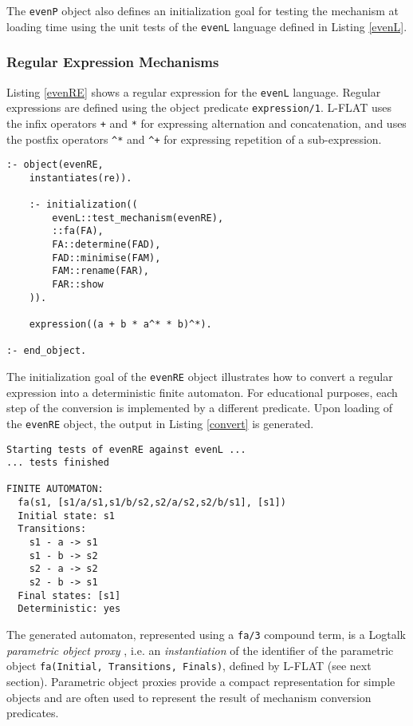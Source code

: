 \documentclass{llncs}
\begin{document}
\noindent
The \lstinline{evenP} object also defines an initialization goal for testing the mechanism at loading time using the unit tests of the \lstinline{evenL} language defined in Listing \ref{evenL}.


\subsubsection{Regular Expression Mechanisms}

Listing \ref{evenRE} shows a regular expression for the \lstinline{evenL} language. Regular expressions are defined using the object predicate \lstinline{expression/1}. L-FLAT uses the infix operators \lstinline{+} and \lstinline{*} for expressing alternation and concatenation, and uses the postfix operators \lstinline{^*} and \lstinline{^+} for expressing repetition of a sub-expression.

\begin{lstlisting}[caption={Regular expression for the \lstinline{evenL} language}, label=evenRE]
:- object(evenRE,
    instantiates(re)).

    :- initialization((
        evenL::test_mechanism(evenRE),
        ::fa(FA),
        FA::determine(FAD),
        FAD::minimise(FAM),
        FAM::rename(FAR),
        FAR::show
    )).

    expression((a + b * a^* * b)^*).

:- end_object.
\end{lstlisting}

\noindent
The initialization goal of the \lstinline{evenRE} object illustrates how to convert a regular expression into a deterministic finite automaton. For educational purposes, each step of the conversion is implemented by a different predicate. Upon loading of the \lstinline{evenRE} object, the output in Listing \ref{convert} is generated.



\begin{lstlisting}[caption={Output generated when loading the \lstinline{evenRE} regular expression}, label=convert]
Starting tests of evenRE against evenL ...
... tests finished

FINITE AUTOMATON:
  fa(s1, [s1/a/s1,s1/b/s2,s2/a/s2,s2/b/s1], [s1])
  Initial state: s1
  Transitions:
	s1 - a -> s1
	s1 - b -> s2
	s2 - a -> s2
	s2 - b -> s1
  Final states: [s1]
  Deterministic: yes
\end{lstlisting}

\noindent
The generated automaton, represented using a \lstinline{fa/3} compound term, is a Logtalk \textsl{parametric object proxy} \cite{pmoura11a}, i.e. an \textsl{instantiation} of the identifier of the parametric object \lstinline{fa(Initial, Transitions, Finals)}, defined by L-FLAT (see next section). Parametric object proxies provide a compact representation for simple objects and are often used to represent the result of mechanism conversion predicates.
\end{document}

